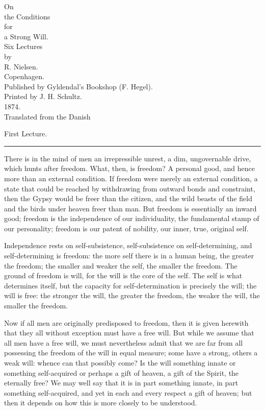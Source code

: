 \documentclass[12pt,a4paper,openany]{book}
\newcommand{\opage}[1]{\marginnote{\footnotesize\textit{[#1]}}}
\newcommand{\lecture}[1]{\clearpage\begin{center}{\large #1}\\[0.4em]\rule{3em}{0.4pt}\end{center}\medskip\noindent}
\begin{document}
\begin{titlepage}
\begin{center}
\vspace*{3em}
{\large On}\\[0.6em]
{\Huge the Conditions}\\[0.6em]
{\large for}\\[0.6em]
{\Huge a Strong Will.}\\[2.5em]
Six Lectures\\[1em]
by\\[1em]
{\large R. Nielsen.}\\[5em]
Copenhagen.\\[0.5em]
Published by Gyldendal's Bookshop (F. Hegel).\\[0.5em]
{\small Printed by J. H. Schultz.}\\[0.5em]
{\small 1874.}\\[3em]
{\small Translated from the Danish}
\end{center}
\end{titlepage}

\setcounter{footnote}{0}%
\lecture{First Lecture.}\opage{1}

There is in the mind of men an irrepressible unrest, a dim, ungovernable
drive, which hunts after freedom. What, then, is freedom? A personal
good, and hence more than an external condition. If freedom were merely
an external condition, a state that could be reached by withdrawing from
outward bonds and constraint, then the Gypsy would be freer than the citizen,
and the wild beasts of the field and the birds under heaven
freer than man. But freedom is essentially an inward
good; freedom is the independence of our individuality, the fundamental
stamp of our personality; freedom is our patent of nobility, our inner,
true, original self.

Independence rests on self-subsistence, self-subsistence
on self-determining, and self-determining is freedom: the more
self there is in a human being, the greater the freedom; the
smaller and weaker the self, the smaller the freedom.
The ground of freedom is will, for the will is the core of the self.
The self is what determines itself, but the capacity for self-determination
is precisely the will; the will is free: the stronger the will, the
greater the freedom, the weaker the will, the smaller the freedom.

Now if all men are originally predisposed to freedom,
then it is given herewith that they all without exception must
have a free will. But while we assume that all men
have a free will, we must nevertheless admit that we are far from all
possessing the freedom of the will in equal measure; some have a strong,
others a weak will: whence can that possibly come? Is
the will something innate or something self-acquired or perhaps
\setcounter{footnote}{0}%
\opage{2}a gift of heaven, a gift of the Spirit, the eternally free? We
may well say that it is in part something innate, in part
something self-acquired, and yet in each and every respect a gift of heaven;
but then it depends on how this is more closely
to be understood.
\end{document}

